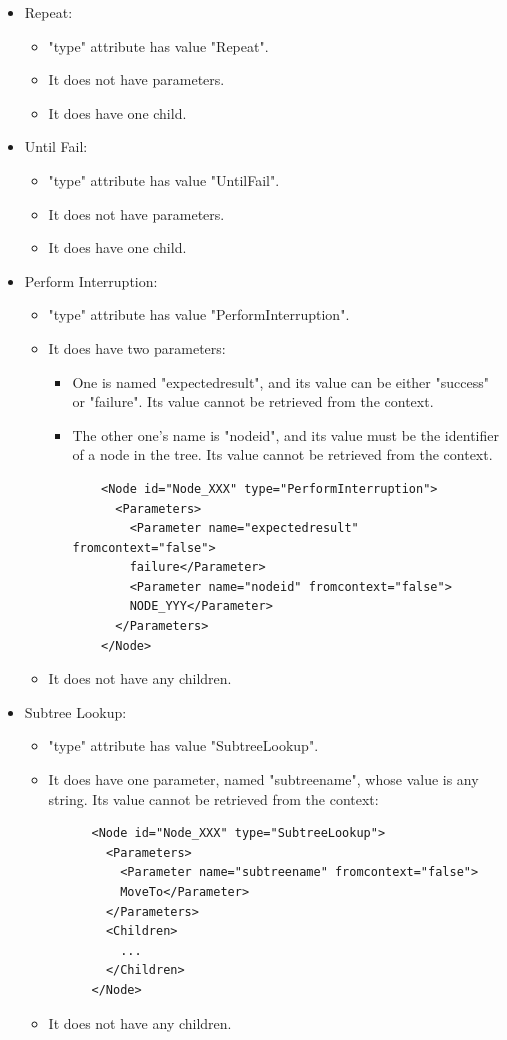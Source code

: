 \documentclass[a4paper,10pt]{article}
\begin{document}
\begin{itemize}
\item Repeat:

  \begin{itemize}
  \item "type" attribute has value "Repeat".
  \item It does not have parameters.
  \item It does have one child.
  \end{itemize}

\item Until Fail:

  \begin{itemize}
  \item "type" attribute has value "UntilFail".
  \item It does not have parameters.
  \item It does have one child.
  \end{itemize}

\item Perform Interruption:

  \begin{itemize}
  \item "type" attribute has value "PerformInterruption".
  \item It does have two parameters:
    \begin{itemize}
      \item One is named "expectedresult", and its value can be either "success" or "failure". Its value cannot be retrieved from the context.
      \item The other one's name is "nodeid", and its value must be the identifier of a node in the tree. Its value cannot be retrieved from the context.
      \begin{verbatim}
    <Node id="Node_XXX" type="PerformInterruption">
      <Parameters>
        <Parameter name="expectedresult" fromcontext="false">
        failure</Parameter>
        <Parameter name="nodeid" fromcontext="false">
        NODE_YYY</Parameter>
      </Parameters>
    </Node>
      \end{verbatim}
    \end{itemize}
  \item It does not have any children.
  \end{itemize}

\item Subtree Lookup:

  \begin{itemize}
  \item "type" attribute has value "SubtreeLookup".
  \item It does have one parameter, named "subtreename", whose value is any string. Its value cannot be retrieved from the context:
   \begin{verbatim}
      <Node id="Node_XXX" type="SubtreeLookup">
        <Parameters>
          <Parameter name="subtreename" fromcontext="false">
          MoveTo</Parameter>
        </Parameters>
        <Children>
          ...
        </Children>
      </Node>
    \end{verbatim}
  \item It does not have any children.
  \end{itemize}


\end{itemize}
\end{document}
